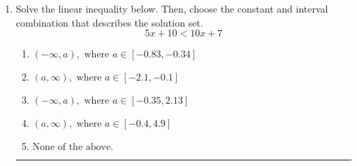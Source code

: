 \documentclass[14pt]{extbook}
\newcommand{\litem}[1]{\item#1\hspace*{-1cm}\rule{\textwidth}{0.4pt}}
\begin{document}
\begin{enumerate}
{\begin{enumerate}[label=\Alph*.]
\end{enumerate} }
\litem{
Solve the linear inequality below. Then, choose the constant and interval combination that describes the solution set.\[ 5x + 10 < 10x + 7 \]\begin{enumerate}[label=\Alph*.]
\item \( (-\infty, a), \text{ where } a \in [-0.83, -0.34] \)
\item \( (a, \infty), \text{ where } a \in [-2.1, -0.1] \)
\item \( (-\infty, a), \text{ where } a \in [-0.35, 2.13] \)
\item \( (a, \infty), \text{ where } a \in [-0.4, 4.9] \)
\item \( \text{None of the above}. \)

\end{enumerate} }
\end{enumerate}
\end{document}

